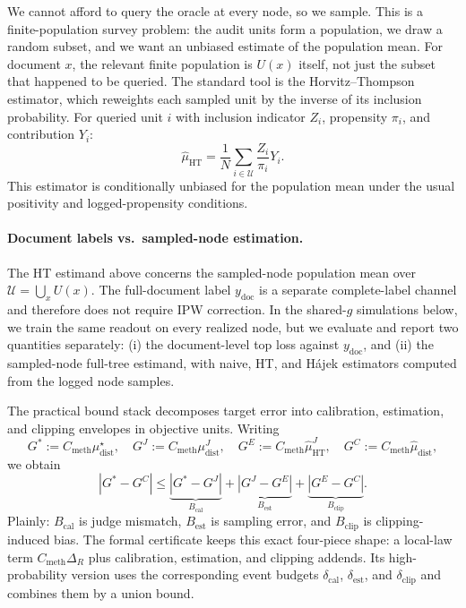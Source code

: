 We cannot afford to query the oracle at every node, so we sample. This is a finite-population survey problem: the audit units form a population, we draw a random subset, and we want an unbiased estimate of the population mean. For document $x$, the relevant finite population is $U(x)$ itself, not just the subset that happened to be queried. The standard tool is the Horvitz--Thompson estimator, which reweights each sampled unit by the inverse of its inclusion probability. For queried unit $i$ with inclusion indicator $Z_i$, propensity $\pi_i$, and contribution $Y_i$:
\[
\hat{\mu}_{\mathrm{HT}} = \frac{1}{N}\sum_{i \in \mathcal{U}} \frac{Z_i}{\pi_i}Y_i.
\]
This estimator is conditionally unbiased for the population mean under the usual positivity and logged-propensity conditions.

\paragraph{Document labels vs.\ sampled-node estimation.}
The HT estimand above concerns the sampled-node population mean over $\mathcal{U}=\bigcup_x U(x)$. The full-document label $y_{\mathrm{doc}}$ is a separate complete-label channel and therefore does not require IPW correction. In the shared-$g$ simulations below, we train the same readout on every realized node, but we evaluate and report two quantities separately: (i) the document-level top loss against $y_{\mathrm{doc}}$, and (ii) the sampled-node full-tree estimand, with naive, HT, and H\'ajek estimators computed from the logged node samples.

The practical bound stack decomposes target error into calibration, estimation, and clipping envelopes in objective units. Writing
\[
G^\ast := C_{\mathrm{meth}}\mu_{\mathrm{dist}}^{\star},\quad
G^J := C_{\mathrm{meth}}\mu_{\mathrm{dist}}^{J},\quad
G^E := C_{\mathrm{meth}}\hat{\mu}_{\mathrm{HT}}^{J},\quad
G^C := C_{\mathrm{meth}}\hat{\mu}_{\mathrm{dist}},
\]
we obtain
\[
|G^\ast-G^C| \le \underbrace{|G^\ast-G^J|}_{B_{\mathrm{cal}}} + \underbrace{|G^J-G^E|}_{B_{\mathrm{est}}} + \underbrace{|G^E-G^C|}_{B_{\mathrm{clip}}}.
\]
Plainly: $B_{\mathrm{cal}}$ is judge mismatch, $B_{\mathrm{est}}$ is sampling error, and $B_{\mathrm{clip}}$ is clipping-induced bias. The formal certificate keeps this exact four-piece shape: a local-law term $C_{\mathrm{meth}}\Delta_R$ plus calibration, estimation, and clipping addends. Its high-probability version uses the corresponding event budgets $\delta_{\mathrm{cal}}$, $\delta_{\mathrm{est}}$, and $\delta_{\mathrm{clip}}$ and combines them by a union bound.

